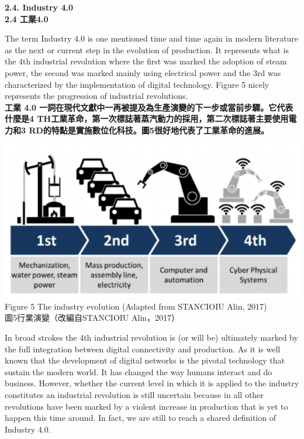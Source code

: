 \documentclass[24pt]{article} %
\begin{document}
\begin{center}
\Large \textbf{2.4.  Industry 4.0}\\

\Large \textbf{2.4 工業4.0}\\
\end{center}
The term Industry 4.0 is one mentioned time and time again in modern literature as the next or current step in the evolution of production. It represents what is the 4th industrial revolution where the first was marked the adoption of steam power, the second was marked mainly using electrical power and the 3rd was characterized by the implementation of digital technology. Figure 5 nicely represents the progression of industrial revolutions.\\

\textbf{工業 4.0 一詞在現代文獻中一再被提及為生產演變的下一步或當前步驟。它代表什麼是4 TH工業革命，第一次標誌著蒸汽動力的採用，第二次標誌著主要使用電力和3 RD的特點是實施數位化科技。圖5很好地代表了工業革命的進展。}\\

\begin{center}
\includegraphics[width=15cm]{5.png}\\

Figure 5 The industry evolution (Adapted from STANCIOIU Alin, 2017)  \\

圖5行業演變（改編自STANCIOIU Alin，2017） \\

\end{center}

In broad strokes the 4th industrial revolution is (or will be) ultimately marked by the full integration between digital connectivity and production. As it is well known that the development of digital networks is the pivotal technology that sustain the modern world. It has changed the way humans interact and do business. However, whether the current level in which it is applied to the industry constitutes an industrial revolution is still uncertain because in all other revolutions have been marked by a violent increase in production that is yet to happen this time around. In fact, we are still to reach a shared definition of Industry 4.0.\\
\end{document}
